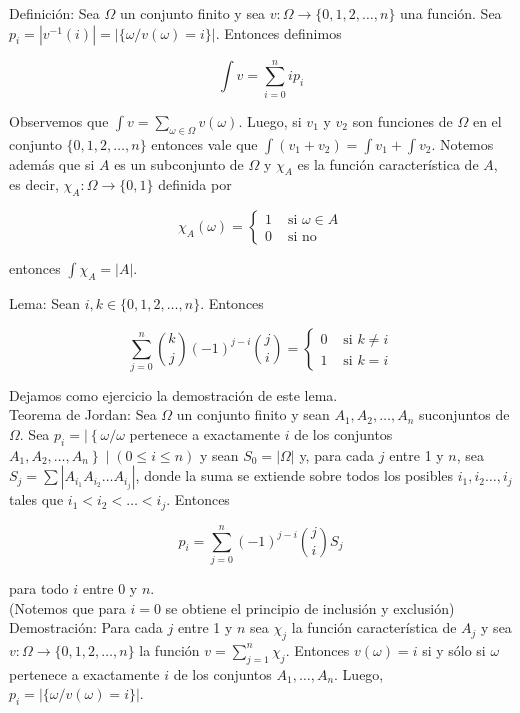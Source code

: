 \documentclass[10pt]{article}
\begin{document}
Definición: Sea $\Omega$ un conjunto finito y sea $v: \Omega \longrightarrow\{0,1,2, \ldots, n\}$ una función. Sea $p_{i}=\left|v^{-1}(i)\right|=|\{\omega / v(\omega)=i\}|$. Entonces definimos

$$
\int v=\sum_{i=0}^{n} i p_{i}
$$

Observemos que $\int v=\sum_{\omega \in \Omega} v(\omega)$. Luego, si $v_{1}$ y $v_{2}$ son funciones de $\Omega$ en el conjunto $\{0,1,2, \ldots, n\}$ entonces vale que $\int\left(v_{1}+v_{2}\right)=\int v_{1}+\int v_{2}$. Notemos además que si $A$ es un subconjunto de $\Omega$ y $\chi_{A}$ es la función característica de $A$, es decir, $\chi_{A}: \Omega \longrightarrow\{0,1\}$ definida por

$$
\chi_{A}(\omega)= \begin{cases}1 & \text { si } \omega \in A \\ 0 & \text { si no }\end{cases}
$$

entonces $\int \chi_{A}=|A|$.

Lema: Sean $i, k \in\{0,1,2, \ldots, n\}$. Entonces

$$
\sum_{j=0}^{n}\binom{k}{j}(-1)^{j-i}\binom{j}{i}= \begin{cases}0 & \text { si } k \neq i \\ 1 & \text { si } k=i\end{cases}
$$

Dejamos como ejercicio la demostración de este lema.\\
Teorema de Jordan: Sea $\Omega$ un conjunto finito y sean $A_{1}, A_{2}, \ldots, A_{n}$ suconjuntos de $\Omega$. Sea $p_{i}=\mid\left\{\omega / \omega\right.$ pertenece a exactamente $i$ de los conjuntos $\left.A_{1}, A_{2}, \ldots, A_{n}\right\} \mid(0 \leq i \leq n)$ y sean $S_{0}=|\Omega|$ y, para cada $j$ entre 1 y $n$, sea $S_{j}=\sum\left|A_{i_{1}} A_{i_{2}} \ldots A_{i_{j}}\right|$, donde la suma se extiende sobre todos los posibles $i_{1}, i_{2} \ldots, i_{j}$ tales que $i_{1}<i_{2}<\ldots<i_{j}$. Entonces

$$
p_{i}=\sum_{j=0}^{n}(-1)^{j-i}\binom{j}{i} S_{j}
$$

para todo $i$ entre 0 y $n$.\\
(Notemos que para $i=0$ se obtiene el principio de inclusión y exclusión)\\
Demostración: Para cada $j$ entre 1 y $n$ sea $\chi_{j}$ la función característica de $A_{j}$ y sea $v: \Omega \longrightarrow\{0,1,2, \ldots, n\}$ la función $v=\sum_{j=1}^{n} \chi_{j}$. Entonces $v(\omega)=i$ si y sólo si $\omega$ pertenece a exactamente $i$ de los conjuntos $A_{1}, \ldots, A_{n}$. Luego, $p_{i}=|\{\omega / v(\omega)=i\}|$.
\end{document}
